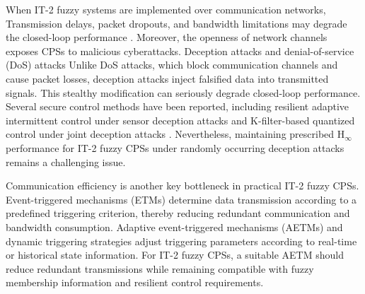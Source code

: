 \documentclass[preprint,review,fleqn,sort&compress,3p]{elsarticle}
\theoremstyle{definition} %
\theoremstyle{definition}%
\newif\ifreviewmarkup
\DeclareRobustCommand{\revdel}[1]{\ifreviewmarkup{\color{revisionred}\hypersetup{linkcolor=revisionred,citecolor=revisionred}#1}\fi}
\DeclareRobustCommand{\revadd}[1]{{\ifreviewmarkup\color{revisiongreen}\hypersetup{linkcolor=revisiongreen,citecolor=revisiongreen}\fi#1}}
\begin{document}
\label{rev:M04}When IT-2 fuzzy systems are implemented over communication networks, \revdel{their
flexibility is improved, but several network-induced constraints are also
introduced.} Transmission delays, packet dropouts, and bandwidth limitations may
degrade the closed-loop performance \cite{zhangNetworkedControlSystems2020,pangNetworkedPredictiveControl2026}.
Moreover, the openness of network channels exposes CPSs to malicious cyberattacks.
Deception attacks
\cite{yaoSecureControlMarkovian2023c,lianSwitchingLikeEventTriggeredControl2021}
and denial-of-service (DoS) attacks
\cite{zhaDynamicEventTriggeredOutput2022, buEventTriggeredDataDrivenControl2023}
\label{rev:M05}\revdel{are two common cyber threats to CPSs..} Unlike DoS attacks, which block communication
channels and cause packet losses, deception attacks inject falsified data into
transmitted signals. This stealthy modification can seriously degrade closed-loop
performance. Several secure control methods have been
reported, including resilient adaptive intermittent control under sensor deception
attacks \cite{wangResilientAdaptiveIntermittent2024} and K-filter-based quantized
control under joint deception attacks \cite{wangResilientAdaptiveStabilization2025}.
Nevertheless, maintaining prescribed $\mathrm{H}_\infty$ performance for IT-2 fuzzy
CPSs under randomly occurring deception attacks remains a challenging issue.

Communication efficiency is another key bottleneck in practical IT-2 fuzzy CPSs.
Event-triggered mechanisms (ETMs)
\cite{postoyanFrameworkEventTriggeredStabilization2015,chenFinitetimeStabilityNonlinear2026}
determine data transmission according to a predefined triggering criterion, thereby reducing redundant communication and bandwidth consumption.
\label{rev:M06}\revdel{However, conventional static ETMs use fixed
thresholds and cannot adapt well to state fluctuations caused by attacks,
disturbances, or actuator anomalies.} Adaptive event-triggered mechanisms (AETMs)
\cite{xingSwitchedFuzzyControl2024,duFaultTolerantHInfinityStabilization2025}
and dynamic triggering strategies \cite{tanDynamicMemoryEventTriggeredSlidingMode2025}
adjust triggering parameters according to real-time or historical state
information. For IT-2 fuzzy CPSs, a suitable AETM should reduce redundant
transmissions while remaining compatible with fuzzy membership information and
resilient control requirements.
\end{document}

